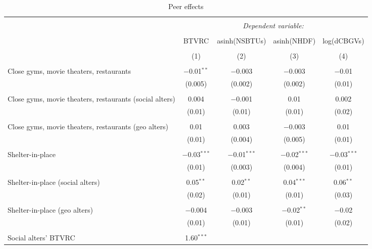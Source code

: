 
\begin{table}[!htbp] \centering 
  \caption{Peer effects} 
  \label{tab:iv} 
\footnotesize 
\begin{tabular}{@{\extracolsep{5pt}}lcccc} 
\\[-1.8ex]\hline 
\hline \\[-1.8ex] 
 & \multicolumn{4}{c}{\textit{Dependent variable:}} \\ 
\cline{2-5} 
\\[-1.8ex] & BTVRC & asinh(NSBTUs) & asinh(NHDF) & log(dCBGVs) \\ 
\\[-1.8ex] & (1) & (2) & (3) & (4)\\ 
\hline \\[-1.8ex] 
 Close gyms, movie theaters, restaurants & $-$0.01$^{**}$ & $-$0.003 & $-$0.003 & $-$0.01 \\ 
  & (0.005) & (0.002) & (0.002) & (0.01) \\ 
  & & & & \\ 
 Close gyms, movie theaters, restaurants (social alters) & 0.004 & $-$0.001 & 0.01 & 0.002 \\ 
  & (0.01) & (0.01) & (0.01) & (0.02) \\ 
  & & & & \\ 
 Close gyms, movie theaters, restaurants (geo alters) & 0.01 & 0.003 & $-$0.003 & 0.01 \\ 
  & (0.01) & (0.004) & (0.005) & (0.01) \\ 
  & & & & \\ 
 Shelter-in-place & $-$0.03$^{***}$ & $-$0.01$^{***}$ & $-$0.02$^{***}$ & $-$0.03$^{***}$ \\ 
  & (0.01) & (0.003) & (0.004) & (0.01) \\ 
  & & & & \\ 
 Shelter-in-place (social alters) & 0.05$^{**}$ & 0.02$^{**}$ & 0.04$^{***}$ & 0.06$^{**}$ \\ 
  & (0.02) & (0.01) & (0.01) & (0.03) \\ 
  & & & & \\ 
 Shelter-in-place (geo alters) & $-$0.004 & $-$0.003 & $-$0.02$^{**}$ & $-$0.02 \\ 
  & (0.01) & (0.01) & (0.01) & (0.02) \\ 
  & & & & \\ 
 Social alters' BTVRC & 1.60$^{***}$ &  &  &  \\ 

\end{tabular}
\end{table}
